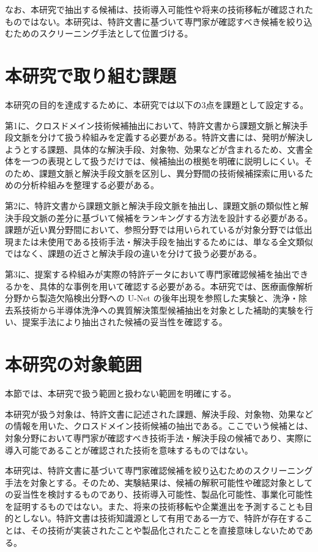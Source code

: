 なお、本研究で抽出する候補は、技術導入可能性や将来の技術移転が確認されたものではない。本研究は、特許文書に基づいて専門家が確認すべき候補を絞り込むためのスクリーニング手法として位置づける。

\section{本研究で取り組む課題}

本研究の目的を達成するために、本研究では以下の3点を課題として設定する。

第1に、クロスドメイン技術候補抽出において、特許文書から課題文脈と解決手段文脈を分けて扱う枠組みを定義する必要がある。特許文書には、発明が解決しようとする課題、具体的な解決手段、対象物、効果などが含まれるため、文書全体を一つの表現として扱うだけでは、候補抽出の根拠を明確に説明しにくい。そのため、課題文脈と解決手段文脈を区別し、異分野間の技術候補探索に用いるための分析枠組みを整理する必要がある。

第2に、特許文書から課題文脈と解決手段文脈を抽出し、課題文脈の類似性と解決手段文脈の差分に基づいて候補をランキングする方法を設計する必要がある。課題が近い異分野間において、参照分野では用いられているが対象分野では低出現または未使用である技術手法・解決手段を抽出するためには、単なる全文類似ではなく、課題の近さと解決手段の違いを分けて扱う必要がある。

第3に、提案する枠組みが実際の特許データにおいて専門家確認候補を抽出できるかを、具体的な事例を用いて確認する必要がある。本研究では、医療画像解析分野から製造欠陥検出分野への U-Net の後年出現を参照した実験と、洗浄・除去系技術から半導体洗浄への異質解決策型候補抽出を対象とした補助的実験を行い、提案手法により抽出された候補の妥当性を確認する。

\section{本研究の対象範囲}

本節では、本研究で扱う範囲と扱わない範囲を明確にする。

本研究が扱う対象は、特許文書に記述された課題、解決手段、対象物、効果などの情報を用いた、クロスドメイン技術候補の抽出である。ここでいう候補とは、対象分野において専門家が確認すべき技術手法・解決手段の候補であり、実際に導入可能であることが確認された技術を意味するものではない。

本研究は、特許文書に基づいて専門家確認候補を絞り込むためのスクリーニング手法を対象とする。そのため、実験結果は、候補の解釈可能性や確認対象としての妥当性を検討するものであり、技術導入可能性、製品化可能性、事業化可能性を証明するものではない。また、将来の技術移転や企業進出を予測することも目的としない。特許文書は技術知識源として有用である一方で、特許が存在することは、その技術が実装されたことや製品化されたことを直接意味しないためである。

